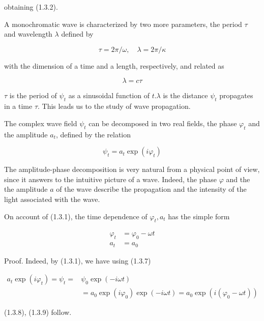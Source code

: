 \documentclass{article}
\begin{document}
obtaining (1.3.2).

A monochromatic wave is characterized by two more parameters, the period $\tau$ and wavelength $\lambda$ defined by
 
\begin{equation*}
\tau=2 \pi / \omega, \quad \lambda=2 \pi / \kappa \tag{1.3.5}
\end{equation*}
 
with the dimension of a time and a length, respectively, and related as
 
\begin{equation*}
\lambda=c \tau \tag{1.3.6}
\end{equation*}
 
$\tau$ is the period of $\psi_{t}$ as a sinusoidal function of $t . \lambda$ is the distance $\psi_{t}$ propagates in a time $\tau$. This leads us to the study of wave propagation.

The complex wave field $\psi_{t}$ can be decomposed in two real fields, the phase $\varphi_{t}$ and the amplitude $a_{t}$, defined by the relation
 
\begin{equation*}
\psi_{t}=a_{t} \exp \left(i \varphi_{t}\right) \tag{1.3.7}
\end{equation*}
 

The amplitude-phase decomposition is very natural from a physical point of view, since it answers to the intuitive picture of a wave. Indeed, the phase $\varphi$ and the the amplitude $a$ of the wave describe the propagation and the intensity of the light associated with the wave.

On account of (1.3.1), the time dependence of $\varphi_{t}, a_{t}$ has the simple form
 
\begin{align*}
\varphi_{t} & =\varphi_{0}-\omega t  \tag{1.3.8}\\
a_{t} & =a_{0} \tag{1.3.9}
\end{align*}
 

Proof. Indeed, by (1.3.1), we have using (1.3.7)
 
\begin{align*}
a_{t} \exp \left(i \varphi_{t}\right)=\psi_{t}= & \psi_{0} \exp (-i \omega t)  \tag{1.3.10}\\
& =a_{0} \exp \left(i \varphi_{0}\right) \exp (-i \omega t)=a_{0} \exp \left(i\left(\varphi_{0}-\omega t\right)\right)
\end{align*}
 
(1.3.8), (1.3.9) follow.
\end{document}
